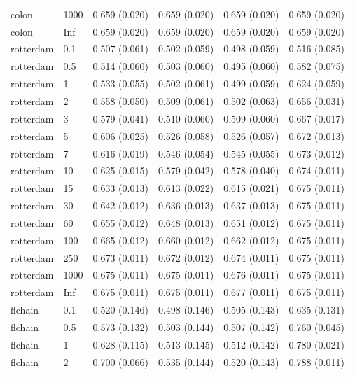 \begin{tabular}{llllll}
  colon & 1000 & 0.659 (0.020) & 0.659 (0.020) & 0.659 (0.020) & 0.659 (0.020) \\ 
  colon & Inf & 0.659 (0.020) & 0.659 (0.020) & 0.659 (0.020) & 0.659 (0.020) \\ 
  rotterdam & 0.1 & 0.507 (0.061) & 0.502 (0.059) & 0.498 (0.059) & 0.516 (0.085) \\ 
  rotterdam & 0.5 & 0.514 (0.060) & 0.503 (0.060) & 0.495 (0.060) & 0.582 (0.075) \\ 
  rotterdam & 1 & 0.533 (0.055) & 0.502 (0.061) & 0.499 (0.059) & 0.624 (0.059) \\ 
  rotterdam & 2 & 0.558 (0.050) & 0.509 (0.061) & 0.502 (0.063) & 0.656 (0.031) \\ 
  rotterdam & 3 & 0.579 (0.041) & 0.510 (0.060) & 0.509 (0.060) & 0.667 (0.017) \\ 
  rotterdam & 5 & 0.606 (0.025) & 0.526 (0.058) & 0.526 (0.057) & 0.672 (0.013) \\ 
  rotterdam & 7 & 0.616 (0.019) & 0.546 (0.054) & 0.545 (0.055) & 0.673 (0.012) \\ 
  rotterdam & 10 & 0.625 (0.015) & 0.579 (0.042) & 0.578 (0.040) & 0.674 (0.011) \\ 
  rotterdam & 15 & 0.633 (0.013) & 0.613 (0.022) & 0.615 (0.021) & 0.675 (0.011) \\ 
  rotterdam & 30 & 0.642 (0.012) & 0.636 (0.013) & 0.637 (0.013) & 0.675 (0.011) \\ 
  rotterdam & 60 & 0.655 (0.012) & 0.648 (0.013) & 0.651 (0.012) & 0.675 (0.011) \\ 
  rotterdam & 100 & 0.665 (0.012) & 0.660 (0.012) & 0.662 (0.012) & 0.675 (0.011) \\ 
  rotterdam & 250 & 0.673 (0.011) & 0.672 (0.012) & 0.674 (0.011) & 0.675 (0.011) \\ 
  rotterdam & 1000 & 0.675 (0.011) & 0.675 (0.011) & 0.676 (0.011) & 0.675 (0.011) \\ 
  rotterdam & Inf & 0.675 (0.011) & 0.675 (0.011) & 0.677 (0.011) & 0.675 (0.011) \\ 
  flchain & 0.1 & 0.520 (0.146) & 0.498 (0.146) & 0.505 (0.143) & 0.635 (0.131) \\ 
  flchain & 0.5 & 0.573 (0.132) & 0.503 (0.144) & 0.507 (0.142) & 0.760 (0.045) \\ 
  flchain & 1 & 0.628 (0.115) & 0.513 (0.145) & 0.512 (0.142) & 0.780 (0.021) \\ 
  flchain & 2 & 0.700 (0.066) & 0.535 (0.144) & 0.520 (0.143) & 0.788 (0.011) \\ 

\end{tabular}
